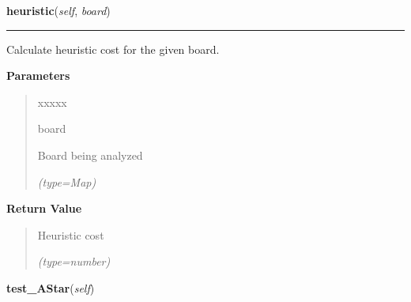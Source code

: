 \hspace{.8\funcindent}\begin{boxedminipage}{\funcwidth}

    \raggedright \textbf{heuristic}(\textit{self}, \textit{board})

    \vspace{-1.5ex}

    \rule{\textwidth}{0.5\fboxrule}
\setlength{\parskip}{2ex}
    Calculate heuristic cost for the given board.

\setlength{\parskip}{1ex}
      \textbf{Parameters}
      \vspace{-1ex}

      \begin{quote}
        \begin{Ventry}{xxxxx}

          \item[board]

          Board being analyzed

            {\it (type=Map)}

        \end{Ventry}

      \end{quote}

      \textbf{Return Value}
    \vspace{-1ex}

      \begin{quote}
      Heuristic cost

      {\it (type=number)}

      \end{quote}

    \end{boxedminipage}

    \label{UnBlockMe:test:PathFinding:pathFindingTests:PathFindingTest:test_AStar}

    \vspace{0.5ex}

\hspace{.8\funcindent}\begin{boxedminipage}{\funcwidth}

    \raggedright \textbf{test\_AStar}(\textit{self})

\setlength{\parskip}{2ex}
\setlength{\parskip}{1ex}
    \end{boxedminipage}



